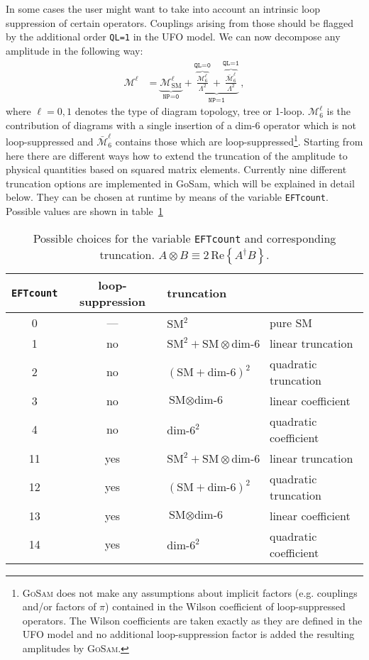 \documentclass[11pt,a4paper]{refrep}
\newcommand{\gosam}{\textsc{GoSam}\xspace}
\def\M{\mathcal{M}}
\begin{document}
In some cases the user might want to take into account an intrinsic loop suppression of certain operators. Couplings arising from those should be flagged by the additional order \texttt{QL=1} in the UFO model. We can now decompose any amplitude in the following way:
\begin{align}\label{eq:amp_truncation}
   \M^\ell &= \underbrace{\M^\ell_\mathrm{SM}}_{\displaystyle\texttt{NP=0}} + \underbrace{\overbrace{\frac{\M^\ell_6}{\Lambda^2}}^{\displaystyle\texttt{QL=0}}  + \overbrace{\frac{\bar{\M}^\ell_6}{\Lambda^2}}^{\displaystyle\texttt{QL=1}}}_{\displaystyle\texttt{NP=1}}\,,
\end{align}
where $\ell=0,1$ denotes the type of diagram topology, tree or 1-loop. $\M^\ell_6$ is the contribution of diagrams with a single insertion of a dim-6 operator which is not loop-suppressed and $\bar{\M}^\ell_6$ contains those which are loop-suppressed\footnote{\gosam does not make any assumptions about implicit factors (e.g. couplings and/or factors of $\pi$) contained in the Wilson coefficient of loop-suppressed operators. The Wilson coefficients are taken exactly as they are defined in the UFO model and no additional loop-suppression factor is added the resulting amplitudes by \gosam.}. Starting from here there are different ways how to extend the truncation of the amplitude to physical quantities based on squared matrix elements. Currently nine different truncation options are implemented in GoSam, which will be explained in detail below. They can be chosen at runtime by means of the variable \texttt{EFTcount}. Possible values are shown in table~\ref{tab:EFTcount}

\begin{table}
\renewcommand{\arraystretch}{1.5}
\begin{tabular}{c|c|l|l}
   \texttt{EFTcount} & loop-suppression & truncation & \\
\hline
   0 & --- & $\text{SM}^2$ & pure SM\\
\hline
   1 & no & $\text{SM}^2 + \text{SM}\otimes\text{dim-6}$ & linear truncation\\
   2 & no & $\left(\text{SM}+\text{dim-6}\right)^2$ & quadratic truncation\\
   3 & no & $\text{SM}\otimes\text{dim-6}$ & linear coefficient\\
   4 & no & $\text{dim-6}^2$ & quadratic coefficient\\
\hline
   11 & yes & $\text{SM}^2 + \text{SM}\otimes\text{dim-6}$ & linear truncation\\
   12 & yes & $\left(\text{SM}+\text{dim-6}\right)^2$ & quadratic truncation\\
   13 & yes & $\text{SM}\otimes\text{dim-6}$ & linear coefficient\\
   14 & yes & $\text{dim-6}^2$ & quadratic coefficient
\end{tabular}
\caption{Possible choices for the variable \texttt{EFTcount} and corresponding truncation. $A\otimes B\equiv2\,\mathrm{Re}\left\{A^\dagger B\right\}$.}
\label{tab:EFTcount}
\renewcommand{\arraystretch}{1.0}
\end{table}
\end{document}
